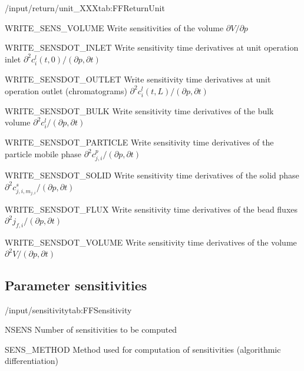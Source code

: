 \begin{groupscope}{/input/return/unit\_XXX}{tab:FFReturnUnit}
\begin{dataset}[type=int, range={$\{0,1\}$}]{WRITE\_SENS\_VOLUME}
    Write sensitivities of the volume $\partial V / \partial p$
  \end{dataset}
  \begin{dataset}[type=int, range={$\{0,1\}$}]{WRITE\_SENSDOT\_INLET}
    Write sensitivity time derivatives at unit operation inlet $\partial^2 c^l_i(t,0) / (\partial p, \partial t)$
  \end{dataset}
  \begin{dataset}[type=int, range={$\{0,1\}$}]{WRITE\_SENSDOT\_OUTLET}
    Write sensitivity time derivatives at unit operation outlet (chromatograms) $\partial^2 c^l_i(t,L) / (\partial p, \partial t)$
  \end{dataset}
  \begin{dataset}[type=int, range={$\{0,1\}$}]{WRITE\_SENSDOT\_BULK}
    Write sensitivity time derivatives of the bulk volume $\partial^2 c^l_i / (\partial p, \partial t)$
  \end{dataset}
  \begin{dataset}[type=int, range={$\{0,1\}$}]{WRITE\_SENSDOT\_PARTICLE}
    Write sensitivity time derivatives of the particle mobile phase $\partial^2 c^p_{j,i} / (\partial p, \partial t)$
  \end{dataset}
  \begin{dataset}[type=int, range={$\{0,1\}$}]{WRITE\_SENSDOT\_SOLID}
    Write sensitivity time derivatives of the solid phase $\partial^2 c^s_{j,i,m_{j,i}} / (\partial p, \partial t)$
  \end{dataset}
  \begin{dataset}[type=int, range={$\{0,1\}$}]{WRITE\_SENSDOT\_FLUX}
    Write sensitivity time derivatives of the bead fluxes $\partial^2 j_{f,i} / (\partial p, \partial t)$
  \end{dataset}
  \begin{dataset}[type=int, range={$\{0,1\}$}]{WRITE\_SENSDOT\_VOLUME}
    Write sensitivity time derivatives of the volume $\partial^2 V / (\partial p, \partial t)$
  \end{dataset}
\end{groupscope}

\subsection{Parameter sensitivities}

\begin{groupscope}{/input/sensitivity}{tab:FFSensitivity} 
  \begin{dataset}[type=int, range={$\geq 0$}, length=1]{NSENS}
    Number of sensitivities to be computed
  \end{dataset}     
  \begin{dataset}[type=string, range={\texttt{ad1}}, length=1]{SENS\_METHOD}
    Method used for computation of sensitivities (algorithmic differentiation)
  \end{dataset}    
\end{groupscope}

